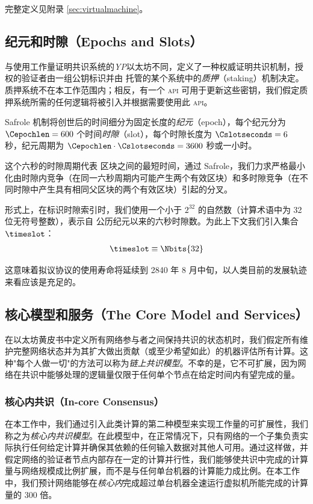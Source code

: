 完整定义见附录 \ref{sec:virtualmachine}。


\subsection{纪元和时隙（Epochs and Slots）}
\label{sec:epochsandslots}

与使用工作量证明共识系统的\emph{YP}以太坊不同，\Jam 定义了一种权威证明共识机制，授权的验证者由一组公钥标识并由 \Jam 托管的某个系统中的\emph{质押}（staking）机制决定。质押系统不在本工作范围内；相反，有一个 \textsc{api} 可用于更新这些密钥，我们假定质押系统所需的任何逻辑将被引入并根据需要使用此 \textsc{api}。

Safrole 机制将创世后的时间细分为固定长度的\emph{纪元}（epoch），每个纪元分为 $\Cepochlen = 600$ 个时间\emph{时隙}（slot），每个时隙长度为 $\Cslotseconds = 6$ 秒，纪元周期为 $\Cepochlen\cdot\Cslotseconds = 3600$ 秒或一小时。

这个六秒的时隙周期代表 \Jam 区块之间的最短时间，通过 Safrole，我们力求严格最小化由时隙内竞争（在同一六秒周期内可能产生两个有效区块）和多时隙竞争（在不同时隙中产生具有相同父区块的两个有效区块）引起的分叉。

形式上，在标识时隙索引时，我们使用一个小于 $2^{32}$ 的自然数（计算术语中为 32 位无符号整数），表示自 \Jam 公历纪元以来的六秒时隙数。为此上下文我们引入集合 $\timeslot$：
\begin{align}\label{eq:time}
  \timeslot \equiv \Nbits{32}
\end{align}

这意味着拟议协议的使用寿命将延续到 2840 年 8 月中旬，以人类目前的发展轨迹来看应该是充足的。

\subsection{核心模型和服务（The Core Model and Services）}\label{sec:coremodelandservices}

在以太坊黄皮书中定义所有网络参与者之间保持共识的状态机时，我们假定所有维护完整网络状态并为其扩大做出贡献（或至少希望如此）的机器评估所有计算。这种"每个人做一切"的方法可以称为\emph{链上共识模型}。不幸的是，它不可扩展，因为网络在共识中能够处理的逻辑量仅限于任何单个节点在给定时间内有望完成的量。

\subsubsection{核心内共识（In-core Consensus）}
在本工作中，我们通过引入此类计算的第二种模型来实现工作量的可扩展性，我们称之为\emph{核心内共识模型}。在此模型中，在正常情况下，只有网络的一个子集负责实际执行任何给定计算并确保其依赖的任何输入数据对其他人可用。通过这样做，并假定网络的验证者节点内部存在一定的计算并行性，我们能够使共识中完成的计算量与网络规模成比例扩展，而不是与任何单台机器的计算能力成比例。在本工作中，我们预计网络能够在\emph{核心内}完成超过单台机器全速运行虚拟机所能完成的计算量的 300 倍。

